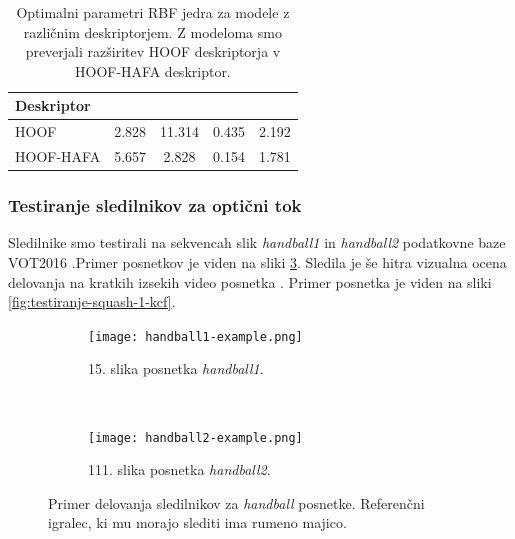 \begin{table}[htb]
	\centering
	\begin{tabular}{l S[table-format=2.3] S[table-format=1.3] S[table-format=1.3] S[table-format=1.3]}
		\toprule
		\textbf{Deskriptor} &  & \thead{$\mathbf{\gamma}$} & \thead{$\mathbf{\epsilon}$} &  \\ 
		\midrule
		HOOF & 2.828 & 11.314 & 0.435 & 2.192 \\
		HOOF-HAFA & 5.657 & 2.828 & 0.154 & 1.781 \\
		\bottomrule
	\end{tabular}
	\caption[Optimalni parameteri RBF jedra modelov za izbiro deskriptorjev]{Optimalni parametri RBF jedra za modele z različnim deskriptorjem. Z modeloma smo preverjali razširitev HOOF deskriptorja v HOOF-HAFA deskriptor.}
	\label{tab:izbira-param}
\end{table}














\subsubsection{Testiranje sledilnikov za optični tok}\label{sec:testiranje-sledilnikov-za-opticni-tok}
Sledilnike smo testirali na sekvencah slik \textit{handball1} in \textit{handball2} podatkovne baze VOT2016 \cite{kristan2016visual}.Primer posnetkov je viden na sliki \ref{fig:testiranje-tracker-visual}. Sledila je še hitra vizualna ocena delovanja na kratkih izsekih video posnetka \cite{squashtv2014squash}. Primer posnetka je viden na sliki \ref{fig:testiranje-squash-1-kcf}.

\begin{figure}[!htbp]
	\centering
	
	\begin{subfigure}[t]{0.45\columnwidth}
		\texttt{[image: handball1-example.png]}
		\caption{15. slika posnetka \textit{handball1}.}
		\label{fig:testiranje-handball1}
	\end{subfigure}
	~
	\begin{subfigure}[t]{0.45\columnwidth}
		\texttt{[image: handball2-example.png]}
		\caption{111. slika posnetka \textit{handball2}.}
		\label{fig:testiranje-handball2}
	\end{subfigure}  
	\caption[Primer delovanja sledilnikov za \textit{handball} posnetke]{Primer delovanja sledilnikov za \textit{handball} posnetke. Referenčni igralec, ki mu morajo slediti ima rumeno majico. }
	\label{fig:testiranje-tracker-visual}
\end{figure}



